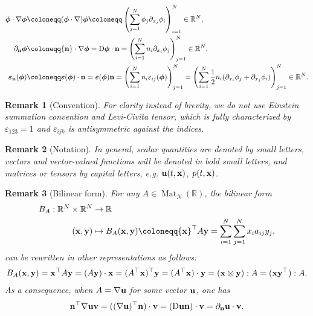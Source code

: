 \documentclass[oneside,11pt]{book}
\numberwithin{equation}{section}
\newtheorem{remark}{Remark}[section]
\begin{document}
\begin{itemize}
\begin{align*}
        \boldsymbol{\phi}\cdot\nabla\boldsymbol{\phi}&\coloneqq(\boldsymbol{\phi}\cdot\nabla)\boldsymbol{\phi}\coloneqq\left(\sum_{j=1}^N \phi_j\partial_{x_j}\phi_i\right)_{i=1}^N\in\mathbb{R}^N,\\
        \partial_{\bf n}\boldsymbol{\phi}&\coloneqq{\bf n}\cdot\nabla\boldsymbol{\phi} = {\rm D}\boldsymbol{\phi}\cdot{\bf n} = \left(\sum_{i=1}^N n_i\partial_{x_i}\phi_j\right)_{j=1}^N\in\mathbb{R}^N,\\
        \boldsymbol{\varepsilon}_{\bf n}(\boldsymbol{\phi})&\coloneqq\boldsymbol{\varepsilon}(\boldsymbol{\phi})\cdot{\bf n} = \boldsymbol{\varepsilon}(\boldsymbol{\phi}){\bf n} = \left(\sum_{i=1}^N n_i\varepsilon_{ij}({\boldsymbol{\phi}})\right)_{j=1}^N = \left(\sum_{i=1}^N \frac{1}{2}n_i(\partial_{x_i}\phi_j + \partial_{x_j}\phi_i)\right)_{j=1}^N\in\mathbb{R}^N.
    \end{align*}
\end{itemize}

\begin{remark}[Convention]
    For clarity instead of brevity, we do not use Einstein summation convention and Levi-Civita tensor, which is fully characterized by $\varepsilon_{123} = 1$ and $\varepsilon_{ijk}$ is antisymmetric against the indices.
\end{remark}

\begin{remark}[Notation]
    In general, scalar quantities are denoted by small letters, vectors and vector-valued functions will be denoted in bold small letters, and matrices or tensors by capital letters, e.g. ${\bf u}(t,{\bf x})$, $p(t,{\bf x})$.
\end{remark}

\begin{remark}[Bilinear form]
    For any $A\in\operatorname{Mat}_N(\mathbb{R})$, the bilinear form
    \begin{align*}
        B_A:\mathbb{R}^N\times\mathbb{R}^N&\to\mathbb{R}\\
        ({\bf x},{\bf y})&\mapsto B_A({\bf x},{\bf y})\coloneqq{\bf x}^\top A{\bf y} = \sum_{i=1}^N\sum_{j=1}^N x_ia_{ij}y_j,
    \end{align*}
    can be rewritten in other representations as follows:
    \begin{align*}
        B_A({\bf x},{\bf y}) = {\bf x}^\top A{\bf y} = (A{\bf y})\cdot{\bf x} = (A^\top{\bf x})^\top{\bf y} = (A^\top{\bf x})\cdot{\bf y} = ({\bf x}\otimes{\bf y}):A = ({\bf x}{\bf y}^\top):A.
    \end{align*}
    As a consequence, when $A = \nabla{\bf u}$ for some vector ${\bf u}$, one has
    \begin{align*}
        {\bf n}^\top\nabla{\bf u}{\bf v} =((\nabla{\bf u})^\top{\bf n})\cdot{\bf v} = ({\rm D}{\bf u}{\bf n})\cdot{\bf v} = \partial_{\bf n}{\bf u}\cdot{\bf v}.
    \end{align*}
\end{remark}
\end{document}
